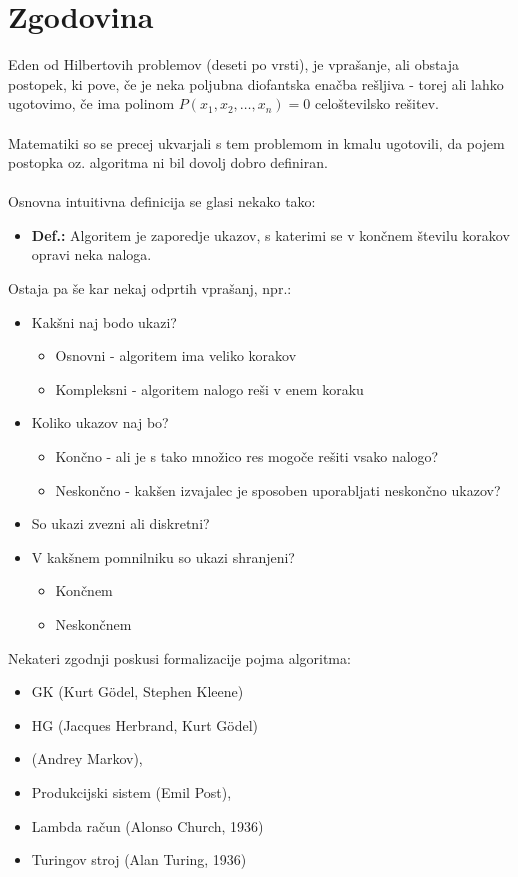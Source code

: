 \documentclass[10pt,a4paper,oneside]{book}
\newcommand\br{%
\ \\ \\
}
\newenvironment{items}{
\begin{itemize}
	\setlength{\itemsep}{2pt}
	\setlength{\parskip}{0pt}
	\setlength{\parsep}{0pt}
	\setlength{\topsep}{0pt}
	\setlength{\leftskip}{0.15cm}
}{\end{itemize}}
\newcommand\Def[1]{%
\begin{items}%
	\item[\textbf{Def.:}]{#1}%
\end{items}%
}
\begin{document}
\section{Zgodovina}
Eden od Hilbertovih problemov (deseti po vrsti), je vprašanje, ali obstaja postopek, ki pove, če je neka poljubna diofantska enačba rešljiva - torej ali lahko ugotovimo, če ima polinom $P(x_1, x_2, \dots, x_n)=0$ celoštevilsko rešitev.
\br
Matematiki so se precej ukvarjali s tem problemom in kmalu ugotovili, da pojem postopka oz. algoritma ni bil dovolj dobro definiran.
\br
Osnovna intuitivna definicija se glasi nekako tako:
\Def{Algoritem je zaporedje ukazov,
s katerimi se v končnem številu korakov opravi neka naloga.}
Ostaja pa še kar nekaj odprtih vprašanj, npr.:
\begin{items}
\item Kakšni naj bodo ukazi? 
	\begin{items}
	\item Osnovni - algoritem ima veliko korakov
	\item Kompleksni - algoritem nalogo reši v enem koraku
	\end{items}
\item Koliko ukazov naj bo?
	\begin{items}
	\item Končno - ali je s tako množico res mogoče rešiti vsako nalogo?
	\item Neskončno - kakšen izvajalec je sposoben uporabljati neskončno ukazov?
	\end{items}
\item So ukazi zvezni ali diskretni?
\item V kakšnem pomnilniku so ukazi shranjeni?
	\begin{items}%
	\item Končnem
	\item Neskončnem
	\end{items}
\end{items}
Nekateri zgodnji poskusi formalizacije pojma algoritma:%
\begin{items}
    \item GK (Kurt Gödel, Stephen Kleene) 
    \item HG (Jacques Herbrand, Kurt Gödel)
    \item (Andrey Markov), %
    \item Produkcijski sistem (Emil Post), %
    \item Lambda račun (Alonso Church, 1936)
    \item Turingov stroj (Alan Turing, 1936)
\end{items}
\end{document}
